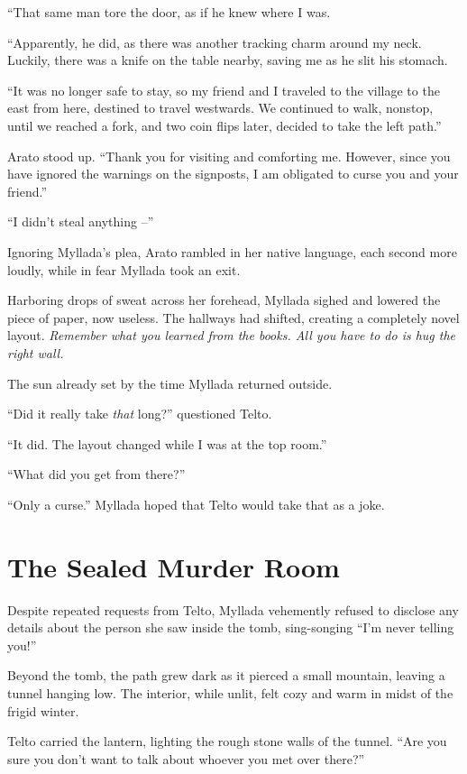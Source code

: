 ``That same man tore the door, as if he knew where I was.

``Apparently, he did, as there was another tracking charm around my neck. Luckily, there was a knife on the table nearby, saving me as he slit his stomach.

``It was no longer safe to stay, so my friend and I traveled to the village to the east from here, destined to travel westwards. We continued to walk, nonstop, until we reached a fork, and two coin flips later, decided to take the left path.''

Arato stood up. ``Thank you for visiting and comforting me. However, since you have ignored the warnings on the signposts, I am obligated to curse you and your friend.''

``I didn't steal anything --''

Ignoring Myllada's plea, Arato rambled in her native language, each second more loudly, while in fear Myllada took an exit.

\centeredstars

Harboring drops of sweat across her forehead, Myllada sighed and lowered the piece of paper, now useless. The hallways had shifted, creating a completely novel layout. \emph{Remember what you learned from the books. All you have to do is hug the right wall.}

\centeredstars

The sun already set by the time Myllada returned outside.

``Did it really take \emph{that} long?'' questioned Telto.

``It did. The layout changed while I was at the top room.''

``What did you get from there?''

``Only a curse.'' Myllada hoped that Telto would take that as a joke.

\chapter{The Sealed Murder Room}

Despite repeated requests from Telto, Myllada vehemently refused to disclose any details about the person she saw inside the tomb, sing-songing ``I'm never telling you!''

Beyond the tomb, the path grew dark as it pierced a small mountain, leaving a tunnel hanging low. The interior, while unlit, felt cozy and warm in midst of the frigid winter.

Telto carried the lantern, lighting the rough stone walls of the tunnel. ``Are you sure you don't want to talk about whoever you met over there?''

